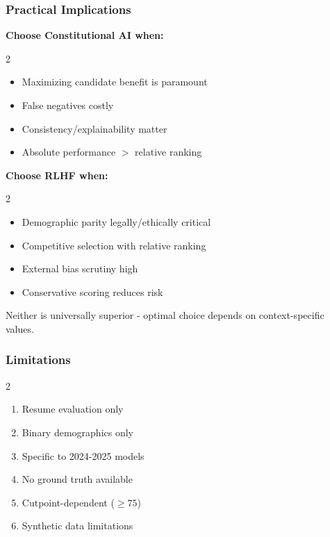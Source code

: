 \documentclass{article}
\begin{document}
\subsubsection{Practical Implications}
\textbf{Choose Constitutional AI when:}
\begin{multicols}{2}


\begin{itemize}
    \item Maximizing candidate benefit is paramount
    \item False negatives costly
    \item Consistency/explainability matter
    \item Absolute performance $>$ relative ranking
\end{itemize}
\end{multicols}

\textbf{Choose RLHF when:}
\begin{multicols}{2}
\begin{itemize}
    \item Demographic parity legally/ethically critical
    \item Competitive selection with relative ranking
    \item External bias scrutiny high
    \item Conservative scoring reduces risk
\end{itemize}

\end{multicols}

Neither is universally superior - optimal choice depends on context-specific values.

\subsubsection{Limitations}

\begin{multicols}{2}
\begin{enumerate}
    \item Resume evaluation only
    \item Binary demographics only
    \item Specific to 2024-2025 models
    \item No ground truth available
    \item Cutpoint-dependent ($\geq 75$)
    \item Synthetic data limitations
\end{enumerate}
\end{multicols}
\end{document}
